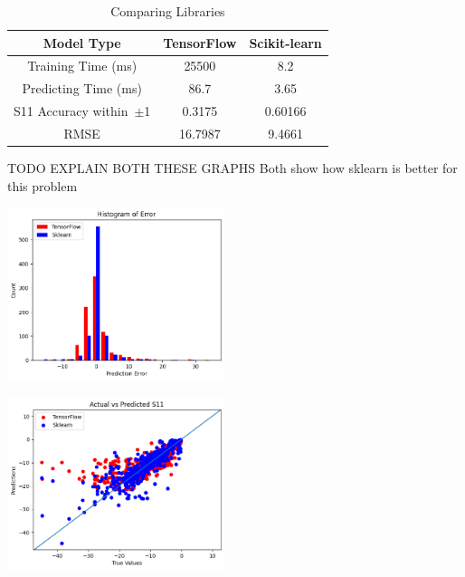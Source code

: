 \documentclass[lettersize,journal]{IEEEtran}
\newenvironment{Figure}
    {\par\medskip\noindent\minipage{\linewidth}}
    {\endminipage\par\medskip}
\begin{document}
\begin{table}[h]
\caption{Comparing Libraries}
\begin{center}
\begin{tabular}{ |c|c|c| }
    \hline
    Model Type & TensorFlow & Scikit-learn \\ 
    \hline
    Training Time (ms) & 25500 & 8.2 \\  
    \hline
    Predicting Time (ms) & 86.7 & 3.65 \\
    \hline
    S11 Accuracy within~$\pm$1 & 0.3175 & 0.60166 \\
    \hline
    RMSE & 16.7987 & 9.4661 \\
    \hline
\end{tabular}
\end{center}
\label{comparing_libraries}
\end{table}

TODO EXPLAIN BOTH THESE GRAPHS
Both show how sklearn is better for this problem

\begin{Figure}
    \centering
    \includegraphics[width=2.5in]{histogram}
    \label{historgram_of_error}
\end{Figure}

\begin{Figure}
    \centering
    \includegraphics[width=2.5in]{actual_vs_predicted_s11}
    \label{actual_vs_predicted_s11}
\end{Figure}
\end{document}
